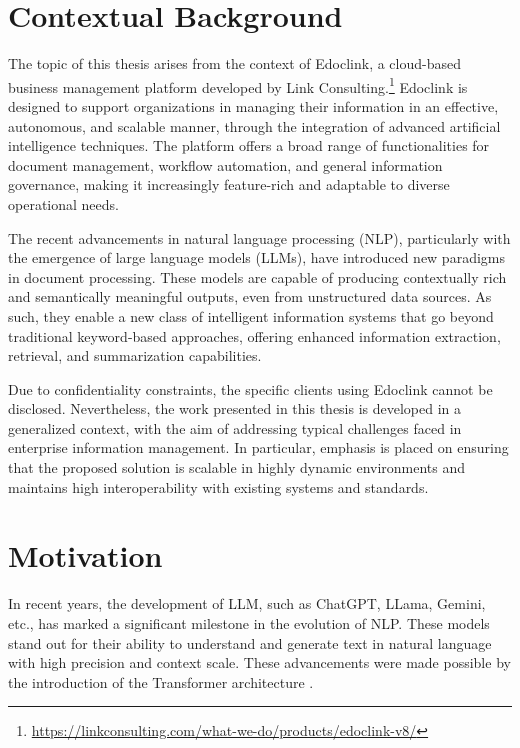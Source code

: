 \cleardoublepage
\label{chap:intro}
\section{Contextual Background}
The topic of this thesis arises from the context of Edoclink, a cloud-based business management platform developed by Link Consulting.\footnote{\url{https://linkconsulting.com/what-we-do/products/edoclink-v8/}} Edoclink is designed to support organizations in managing their information in an effective, autonomous, and scalable manner, through the integration of advanced artificial intelligence techniques. The platform offers a broad range of functionalities for document management, workflow automation, and general information governance, making it increasingly feature-rich and adaptable to diverse operational needs.

The recent advancements in natural language processing (NLP), particularly with the emergence of large language models (\acp{LLM}), have introduced new paradigms in document processing. These models are capable of producing contextually rich and semantically meaningful outputs, even from unstructured data sources. As such, they enable a new class of intelligent information systems that go beyond traditional keyword-based approaches, offering enhanced information extraction, retrieval, and summarization capabilities.

Due to confidentiality constraints, the specific clients using Edoclink cannot be disclosed. Nevertheless, the work presented in this thesis is developed in a generalized context, with the aim of addressing typical challenges faced in enterprise information management. In particular, emphasis is placed on ensuring that the proposed solution is scalable in highly dynamic environments and maintains high interoperability with existing systems and standards.

\section{Motivation}

In recent years, the development of \ac{LLM}, such as ChatGPT, LLama, Gemini, etc., has marked a significant milestone in the evolution of \ac{NLP}. These models stand out for their ability to understand and generate text in natural language with high precision and context scale. These advancements were made possible by the introduction of the Transformer architecture \cite{vaswani2017attention}.


